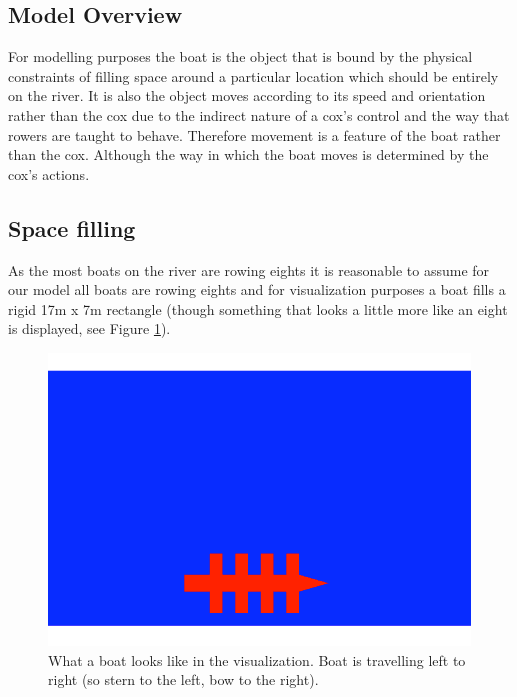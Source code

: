      \subsection{Model Overview}\label{model:boat:simplified}
      For modelling purposes the boat is the object that is bound by the physical constraints of filling space around a particular location which should be entirely on the river. It is also the object moves according to its speed and orientation rather than the cox due to the indirect nature of a cox's control and the way that rowers are taught to behave. Therefore movement is a feature of the boat rather than the cox. Although the way in which the boat moves is determined by the cox's actions.
      
      \subsection{Space filling}\label{model:boat:space_filling}
      As the most boats on the river are rowing eights it is reasonable to assume for our model all boats are rowing eights and for visualization purposes a boat fills a rigid 17m x 7m rectangle (though something that looks a little more like an eight is displayed, see Figure \ref{fig:model:boat}). 
      
      \begin{figure}
      \begin{center}
      	\includegraphics[scale=0.3]{images/boat.png}
      	\caption{What a boat looks like in the visualization. Boat is travelling left to right (so stern to the left, bow to the right).}
      	\label{fig:model:boat}
      \end{center}
      \end{figure}
      
